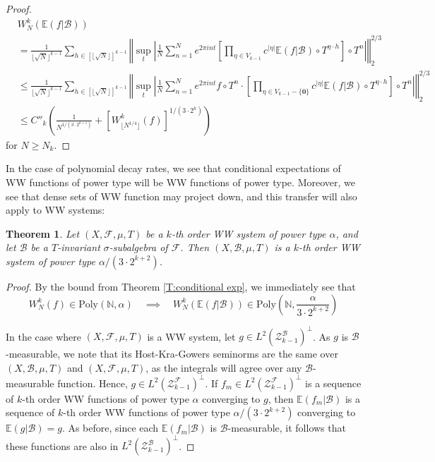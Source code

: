\documentclass[11pt, oneside]{amsart}   	%
\newcommand{\E}{\mathbb{E}}
\newcommand{\1}{\mathbbm{1}}
\newcommand{\N}{\mathbb{N}}
\newcommand{\floor}[1]{\lfloor#1\rfloor}
\newtheorem{theorem}{Theorem}[section]
\theoremstyle{definition}
\begin{document}
\begin{proof}
\begin{align*}
&W_N^k\left( \E(f | \mathcal{B})\right) \\
&=\frac{1}{\lfloor\sqrt{N}\rfloor^{k-1}} \sum_{h \in [\lfloor\sqrt{N}\rfloor]^{k-1}} \left\Vert \sup_t \left| \frac{1}{N} \sum_{n=1}^N e^{2\pi i n t} \left[ \prod_{\eta \in V_{k-1}} c^{|\eta|} \mathbb{E}(f|\mathcal{B}) \circ T^{\eta\cdot h}\right]\circ T^n\right| \right\Vert_2^{2/3} \\
&\leq \frac{1}{\lfloor\sqrt{N}\rfloor^{k-1}} \sum_{h \in [\lfloor\sqrt{N}\rfloor]^{k-1}} \left\Vert \sup_t \left| \frac{1}{N} \sum_{n=1}^N e^{2\pi i n t} f\circ T^n \cdot \left[ \prod_{\eta \in V_{k-1} - \{\textbf{0}\}} c^{|\eta|} \mathbb{E}(f|\mathcal{B}) \circ T^{\eta\cdot h}\right]\circ T^n\right| \right\Vert_2^{2/3}\\
&\leq C''_k \left(\frac{1}{N^{1/(3\cdot 2^{k+1})}} + \left[W_{\floor{N^{1/4}}}^k(f)\right]^{1/(3\cdot 2^{k})} \right)
\end{align*}
for $N\geq N_{k}$.
\end{proof}


In the case of polynomial decay rates, we see that conditional expectations of WW functions of power type will be WW functions of power type. Moreover, we see that dense sets of WW function may project down, and this transfer will also apply to WW systems:
\begin{theorem}
Let $(X, \mathcal{F}, \mu, T)$ be a $k$-th order WW system of power type $\alpha$, and let $\mathcal{B}$ be a $T$-invariant $\sigma$-subalgebra of $\mathcal{F}$. Then $(X, \mathcal{B}, \mu, T)$ is a $k$-th order WW system of power type $\alpha / (3\cdot 2^{k+2})$.
\end{theorem}
\begin{proof}
By the bound from Theorem \ref{T:conditional exp}, we immediately see that
$$W_N^k(f) \in \text{Poly}(\N, \alpha) \quad \implies \quad W^k_N(\E(f|\mathcal{B}))\in \text{Poly}\left(\N, \frac{\alpha}{3 \cdot 2^{k+2}}\right)$$


In the case where $(X, \mathcal{F}, \mu, T)$ is a WW system, let $g \in L^2(\mathcal{Z}^\mathcal{B}_{k-1})^\perp$. As $g$ is $\mathcal{B}$-measurable, we note that its Host-Kra-Gowers seminorms are the same over $(X, \mathcal{B}, \mu, T)$ and $(X, \mathcal{F}, \mu, T)$, as the integrals will agree over any $\mathcal{B}$-measurable function. Hence, $g\in L^2(\mathcal{Z}^\mathcal{F}_{k-1})^\perp$. If $f_m\in L^2(\mathcal{Z}^\mathcal{F}_{k-1})^\perp$ is a sequence of $k$-th order WW functions of power type $\alpha$ converging to $g$, then $\mathbb{E}(f_m|\mathcal{B})$ is a sequence of $k$-th order WW functions of power type $\alpha / (3\cdot 2^{k+2})$ converging to $\mathbb{E}(g|\mathcal{B}) = g$. As before, since each $\mathbb{E}(f_m|\mathcal{B})$ is $\mathcal{B}$-measurable, it follows that these functions are also in $L^2(\mathcal{Z}^\mathcal{B}_{k-1})^\perp$. 
\end{proof}
\end{document}
